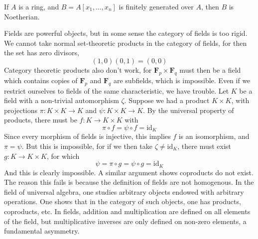 \begin{corollary}
    If $A$ is a ring, and $B = A[x_1, \dots, x_n]$ is finitely generated over $A$, then $B$ is Noetherian.
\end{corollary}


Fields are powerful objects, but in some sense the category of fields is too rigid. We cannot take normal set-theoretic products in the category of fields, for then the set has zero divisors,
%
\[ (1,0)(0,1) = (0,0) \]
%
Category theoretic products also don't work, for $\mathbf{F}_p \times \mathbf{F}_q$ must then be a field which contains copies of $\mathbf{F}_p$ and $\mathbf{F}_q$ are subfields, which is impossible. Even if we restrict ourselves to fields of the same characteristic, we have trouble. Let $K$ be a field with a non-trivial automorphism $\zeta$. Suppose we had a product $K \times K$, with projections $\pi: K \times K \to K$ and $\psi: K \times K \to K$. By the universal property of products, there must be $f: K \to K \times K$ with
%
\[ \pi \circ f = \psi \circ f = \text{id}_K \]
%
Since every morphism of fields is injective, this implies $f$ is an isomorphism, and $\pi = \psi$. But this is impossible, for if we then take $\zeta \neq \text{id}_K$, there must exist $g: K \to K \times K$, for which
%
\[ \psi = \pi \circ g = \psi \circ g = \text{id}_K \]
%
And this is clearly impossible. A similar argument shows coproducts do not exist. The reason this fails is because the definition of fields are not homogenous. In the field of universal algebra, one studies arbitrary objects endowed with arbitrary operations. One shows that in the category of such objects, one has products, coproducts, etc. In fields, addition and multiplication are defined on all elements of the field, but multiplicative inverses are only defined on non-zero elements, a fundamental asymmetry.
